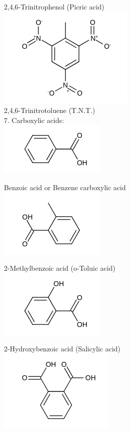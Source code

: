 \documentclass[10pt]{article}
\begin{document}
2,4,6-Trinitrophenol (Picric acid)\\
\includegraphics{smile-555fb93e7c5b31574d4ed60378f9a6156245cf84}\\
2,4,6-Trinitrotoluene (T.N.T.)\\
7. Carboxylic acids:\\
\includegraphics{smile-f80351c1deb23546f1beede06bb5d29b3e3a2252}

Benzoic acid or Benzene carboxylic acid\\
\includegraphics{smile-1c71cca237a3d1dd3c9f843c90f618297b66042d}

2-Methylbenzoic acid (o-Toluic acid)\\
\includegraphics{smile-f8cd89ae6d758f320983f071a3ef366053044c70}

2-Hydroxybenzoic acid (Salicylic acid)\\
\includegraphics{smile-aaf8006fc45c80a673f9eaf7ff827f3e3111ec8d}
\end{document}

